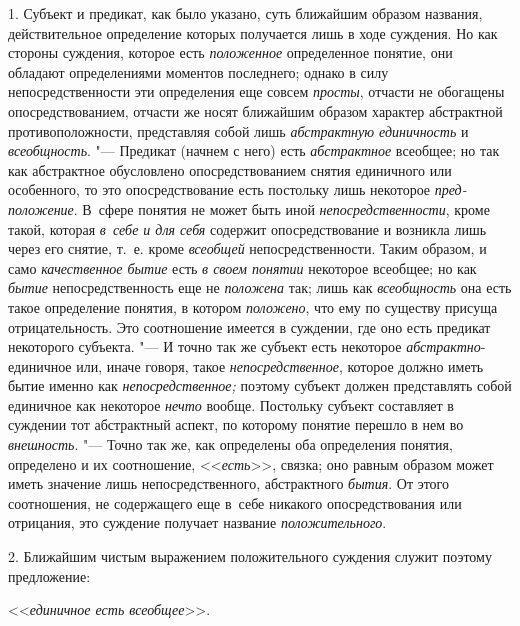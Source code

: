 1. Субъект и предикат, как было указано, суть ближайшим образом названия,
действительное определение которых получается лишь в ходе суждения. Но как
стороны суждения, которое есть {\em положенное} определенное понятие, они
обладают определениями моментов последнего; однако в силу непосредственности
эти определения еще совсем {\em просты}, отчасти не обогащены
опосредствованием, отчасти же носят ближайшим образом характер абстрактной
противоположности, представляя собой лишь {\em абстрактную единичность} и
{\em всеобщность}. "--- Предикат (начнем с него) есть {\em абстрактное}
всеобщее; но так как абстрактное обусловлено опосредствованием снятия
единичного или особенного, то это опосредствование есть постольку лишь
некоторое {\em пред-положение}. В~сфере понятия не может быть иной
{\em непосредственности}, кроме такой, которая {\em в~себе и для себя} содержит
опосредствование и возникла лишь через его снятие, т.~е. кроме {\em всеобщей}
непосредственности. Таким образом, и само {\em качественное бытие} есть {\em в
своем понятии} некоторое всеобщее; но как {\em бытие} непосредственность еще не
{\em положена} так; лишь как {\em всеобщность} она есть такое определение
понятия, в котором {\em положено}, что ему по существу присуща отрицательность.
Это соотношение имеется в суждении, где оно есть предикат некоторого субъекта.
"--- И точно так же субъект есть некоторое {\em абстрактно}{}-единичное или,
иначе говоря, такое {\em непосредственное}, которое должно иметь бытие именно
как {\em непосредственное;} поэтому субъект должен представлять собой единичное
как некоторое {\em нечто} вообще. Постольку субъект составляет в суждении тот
абстрактный аспект, по которому понятие перешло в нем во {\em внешность}. "---
Точно так же, как определены оба определения понятия, определено и их
соотношение, <<{\em есть}>>, связка; оно равным образом может иметь значение
лишь непосредственного, абстрактного {\em бытия}. От этого соотношения, не
содержащего еще в~себе никакого опосредствования или отрицания, это суждение
получает название {\em положительного}.

2. Ближайшим чистым выражением положительного суждения служит
поэтому предложение:

<<{\em единичное есть всеобщее}>>.


